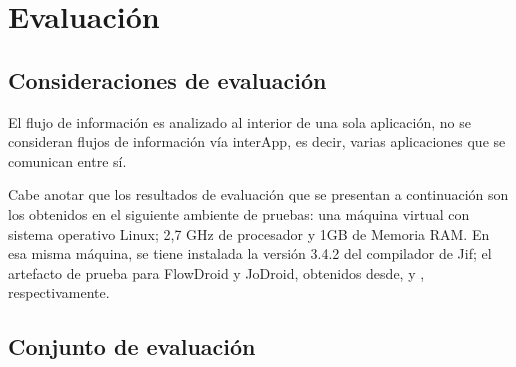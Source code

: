 \label{ch:evaluacion}
\chapter{Evaluación}

\section{Consideraciones de evaluación}
El flujo de información es analizado al interior de una sola aplicación, no se
consideran flujos de información vía interApp, es decir, varias aplicaciones que
se comunican entre sí.

Cabe anotar que los resultados de evaluación que se presentan a continuación son
los obtenidos en el siguiente ambiente de pruebas: una máquina virtual con
sistema operativo Linux; 2,7 GHz de procesador y 1GB de Memoria RAM. En esa
misma máquina, se tiene instalada la versión 3.4.2 del compilador de Jif;
el artefacto de prueba para FlowDroid y JoDroid, obtenidos desde,
\cite{FlowDroid-artifact} y \cite{joDroidManual}, respectivamente.



\section{Conjunto de evaluación}
\label{sec:evalSet}

